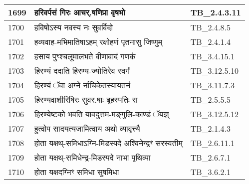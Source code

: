 \documentclass[17pt]{extarticle}
\begin{document}
\begin{longtable}{||p{0.4in}||p{4.9in}||p{0.9in}||}
    1699 & हरिवर्पसं गिरः आचर्.षणिप्रा वृषभो & TB\_2.4.3.11       \\
    
    \hline
        
    1700 & हविषोऽस्य नवस्य नः सुवर्विदो & TB\_2.4.8.5       \\
    
    \hline
        
    1701 & हव्यवाह{-}मभिमातिषाऽहम् रक्षोहणं पृतनासु जिष्णुम् & TB\_2.4.1.4       \\
    
    \hline
        
    1702 & हसाय पुꣳश्चलूमालभते वीणावादं गणकं & TB\_3.4.15.1       \\
    
    \hline
        
    1703 & हिरण्यं ददाति हिरण्य{-}ज्योतिरेव स्वर्गं & TB\_3.12.5.10       \\
    
    \hline
        
    1704 & हिरण्यं ॅवा अग्ने र्नाचिकेतस्यायतनं & TB\_3.11.7.3       \\
    
    \hline
        
    1705 & हिरण्यवाशीरिषिरः सुवर.षाः बृहस्पतिः स & TB\_2.5.5.5       \\
    
    \hline
        
    1706 & हिरण्येष्टको भवति यावदुत्तम{-}मङ्गुलि{-}काण्डं ॅयज्ञ् & TB\_3.12.5.12       \\
    
    \hline
        
    1707 & हुत्वोप सादयत्यजामित्वाय अथो व्यावृत्त्यै & TB\_2.1.4.3       \\
    
    \hline
        
    1708 & होता यक्षथ्{-}समिधाऽग्नि{-}मिडस्पदे अश्विनेन्द्रꣳ सरस्वतीम् & TB\_2.6.11.1       \\
    
    \hline
        
    1709 & होता यक्षथ्{-}समिधेन्द्र{-}मिडस्पदे नाभा पृथिव्या & TB\_2.6.7.1       \\
    
    \hline
        
    1710 & होता यक्षदग्निꣳ समिधा सुषमिधा & TB\_3.6.2.1       \\
    
    \hline
        

\end{longtable}
\end{document}
